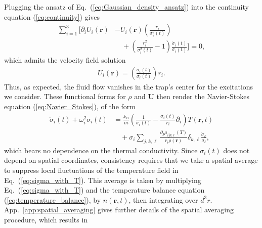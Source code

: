 \documentclass[reprint, amsmath, amssymb, aps, superscriptaddress]{revtex4-1}
\begin{document}
Plugging the ansatz of Eq.~(\ref{eq:Gaussian_density_ansatz}) into the continuity equation (\ref{eq:continuity}) gives
\begin{align}
    \sum_{i = 1}^3
    \bigg[
    \partial_i U_i(\boldsymbol{r})
    &-
    U_i (\boldsymbol{r}) \left( \frac{ r_i }{ \sigma_i^2(t) } \right) \nonumber\\
    &\quad+
    \left( \frac{ r_i^2 }{ \sigma_i^2(t) } - 1 \right)
    \frac{  \dot{\sigma}_i(t) }{ \sigma_i(t) }
    \bigg]
    =
    0,
\end{align}
which admits the velocity field solution
\begin{align} \label{eq:flow_velocity_ansatz}
    U_i(\boldsymbol{r})
    =
    \left(
    \frac{ \dot{\sigma}_i(t) }{ \sigma_i(t) }
    \right) r_i.
\end{align}
Thus, as expected, the fluid flow vanishes in the trap's center for the excitations we consider.
These functional forms for $\rho$ and $\boldsymbol{U}$ then render the Navier-Stokes equation (\ref{eq:Navier_Stokes}), of the form
\begin{align} \label{eq:sigma_with_T} 
    \ddot{\sigma}_i(t) 
    +
    \omega_i^2 \sigma_i(t)
    &= 
    \frac{ k_B }{ m }
    \left( \frac{ 1 }{ \sigma_i(t) }
    -
    \frac{ \sigma_i(t) }{ r_i }
    \partial_i
    \right)
    T(\boldsymbol{r}, t) \nonumber\\[2.5pt]
    &\quad +
    \sigma_i 
    \sum_{j, k, \ell} 
    \frac{ \partial_j \mu_{i j k \ell}(T) }{ r_i \rho(\boldsymbol{r}) } 
    \delta_{k, \ell}
    \frac{ \dot{\sigma}_k }{ \sigma_{\ell} },
\end{align}
which bears no dependence on the thermal conductivity. 
Since $\sigma_i(t)$ does not depend on spatial coordinates, consistency requires that we take a spatial average to suppress local fluctuations of the temperature field in Eq.~(\ref{eq:sigma_with_T}). This average is taken by multiplying Eq.~(\ref{eq:sigma_with_T}) and the temperature balance equation (\ref{eq:temperature_balance}),
by $n(\boldsymbol{r}, t)$, then integrating over $d^3 r$. App.~\ref{app:spatial_averaging} gives further details of the spatial averaging procedure, which results in
\end{document}
